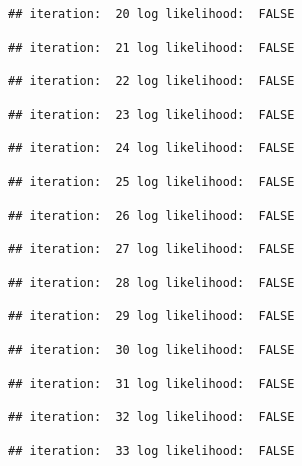 \documentclass[
]{article}
\begin{document}
\begin{lstlisting}
## iteration:  20 log likelihood:  FALSE
\end{lstlisting}

\begin{lstlisting}
## iteration:  21 log likelihood:  FALSE
\end{lstlisting}

\begin{lstlisting}
## iteration:  22 log likelihood:  FALSE
\end{lstlisting}

\begin{lstlisting}
## iteration:  23 log likelihood:  FALSE
\end{lstlisting}

\begin{lstlisting}
## iteration:  24 log likelihood:  FALSE
\end{lstlisting}

\begin{lstlisting}
## iteration:  25 log likelihood:  FALSE
\end{lstlisting}

\begin{lstlisting}
## iteration:  26 log likelihood:  FALSE
\end{lstlisting}

\begin{lstlisting}
## iteration:  27 log likelihood:  FALSE
\end{lstlisting}

\begin{lstlisting}
## iteration:  28 log likelihood:  FALSE
\end{lstlisting}

\begin{lstlisting}
## iteration:  29 log likelihood:  FALSE
\end{lstlisting}

\begin{lstlisting}
## iteration:  30 log likelihood:  FALSE
\end{lstlisting}

\begin{lstlisting}
## iteration:  31 log likelihood:  FALSE
\end{lstlisting}

\begin{lstlisting}
## iteration:  32 log likelihood:  FALSE
\end{lstlisting}

\begin{lstlisting}
## iteration:  33 log likelihood:  FALSE
\end{lstlisting}
\end{document}
